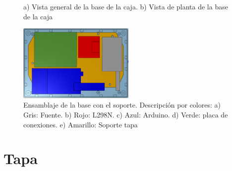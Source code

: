 \newpage

\begin{figure}[htpb]%
    \centering 
    \hspace{10pt}%
    \caption{a) Vista general de la base de la caja. b) Vista de planta de la base de la caja}
    \label{fig:cajabase} 
\end{figure} 


\begin{figure}[hbtp]
    \centering
    \includegraphics[width=0.5\textwidth]{04-caja/ensamblajebase.png}
    \caption{Ensamblaje de la base con el soporte. Descripción por colores: a) Gris: Fuente. 
    b) Rojo: L298N. c) Azul: Arduino. d) Verde: placa de conexiones. e) Amarillo: Soporte tapa}
    \label{fig:ensamblajebase}
    \end{figure}


\section{Tapa}

